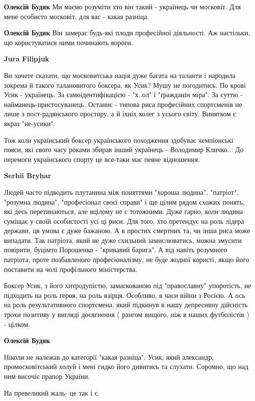 \begin{itemize}
\begin{itemize} %
\textbf{Олексій Будяк} Ми маємо розуміти хто він такий - українець чи московіт. Для мене особисто московіт, для вас - какая разніца.

\textbf{Олексій Будяк} Він замерає будь-які плоди професійної діяльності. Аж настільки, що користуватися ними починають вороги.

\textbf{Jura Filipjuk} 

Ви хочете сказати, що московитська нація дуже багата на таланти і народила
зокрема й такого талановитого боксера, як Усик? Мушу не погодитись. По крові
Усик - українець. За самоідентифікацією - "х..ол" і "ґражданін міра". За суттю
- найманець-пристосуванець. Останнє - типова риса професійних спортсменів не
лише з пост-радянського простору, а й їхніх колег з усього світу. Винятком є
якраз "не-усики".

Тож коли український боксер українського походження здобуває чемпіонські пояси,
які свого часу роками збирав інший українець - Володимир Кличко... До перемоги
українського спорту це все-таки має певне відношення.


\textbf{Serhii Bryhar} 

Людей часто підводить плутанина між поняттями "хороша людина", "патріот",
"розумна людина", "професіонал своєї справи" і ще цілим рядом схожих понять,
які десь перетинаються, але вцілому не є тотожними. Дуже гарно, коли людина
суміщає у своїй особистості усі ці риси. Для того, хто претендує на роль лідера
держави, ця умова є дуже бажаною. А в простих смертних та, чи інша риса може
випадати. Так патріота, який не дуже схильний замислюватись, можна змусити
повірити, буцімто Порошенко - "кривавий барига". А від навіть розумного
патріота, проте позбавленого професіоналізму, не буде жодної користі, якщо його
поставити на чолі профільного міністерства.

Боксер Усик, з його хитродупістю, замаскованою під "православну" упоротість, не
підходить на роль героя, на роль взірця. Особливо, в часи війни з Росією. А ось
на роль результативного спортсмена, який підкинув в нашу депресивну дійсність
трохи позитиву у вигляді досягнення ( рангом вищого, ніж в наших футболістів )
- цілком.

\textbf{Олексій Будяк} 

Ніколи не належав до категорії "какая разніца". Усик, який александр,
промосковітський холуй і мені гидко його дивитись та слухати. Соромно, що над
ним височіє прапор України.

\end{itemize} %

На превеликий жаль- це так і є.




\end{itemize} %
